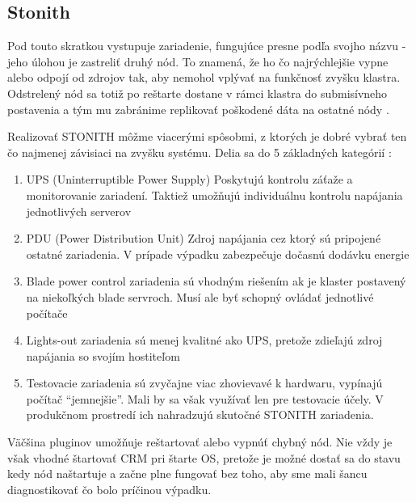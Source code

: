 \subsection{Stonith}
Pod touto skratkou vystupuje zariadenie, fungujúce presne podľa svojho názvu - jeho úlohou je zastreliť druhý nód. To znamená, že ho čo najrýchlejšie vypne alebo odpojí od zdrojov tak, aby nemohol vplývať na funkčnosť zvyšku klastra. Odstrelený nód sa totiž po reštarte dostane v rámci klastra do submisívneho postavenia a tým mu zabránime replikovať poškodené dáta na ostatné nódy \cite{web:felk.cvut.cz}.

Realizovať \ac{STONITH} môžme viacerými spôsobmi, z ktorých je dobré vybrať ten čo najmenej závisiaci na zvyšku systému. Delia sa do 5 základných kategórií \cite{web:opensuse.org}:

\begin{enumerate}
	\item UPS (Uninterruptible Power Supply) Poskytujú kontrolu záťaže a monitorovanie zariadení. Taktiež umožňujú individuálnu kontrolu napájania jednotlivých serverov
	\item PDU (Power Distribution Unit) Zdroj napájania cez ktorý sú pripojené ostatné zariadenia. V prípade výpadku zabezpečuje dočasnú dodávku energie
	\item Blade power control zariadenia sú vhodným riešením ak je klaster postavený na niekoľkých blade servroch. Musí ale byť schopný ovládať jednotlivé počítače
	\item Lights-out zariadenia sú menej kvalitné ako UPS, pretože zdieľajú zdroj napájania so svojím hostiteľom
	\item Testovacie zariadenia sú zvyčajne viac zhovievavé k hardwaru, vypínajú počítač "`jemnejšie"'. Mali by sa však využívať len pre testovacie účely. V produkčnom prostredí ich nahradzujú skutočné STONITH zariadenia.
\end{enumerate}

Väčšina pluginov umožňuje reštartovať alebo vypnúť chybný nód. Nie vždy je však vhodné štartovať CRM pri štarte OS, pretože je možné dostať sa do stavu kedy nód naštartuje a začne plne fungovať bez toho, aby sme mali šancu diagnostikovať čo bolo príčinou výpadku.